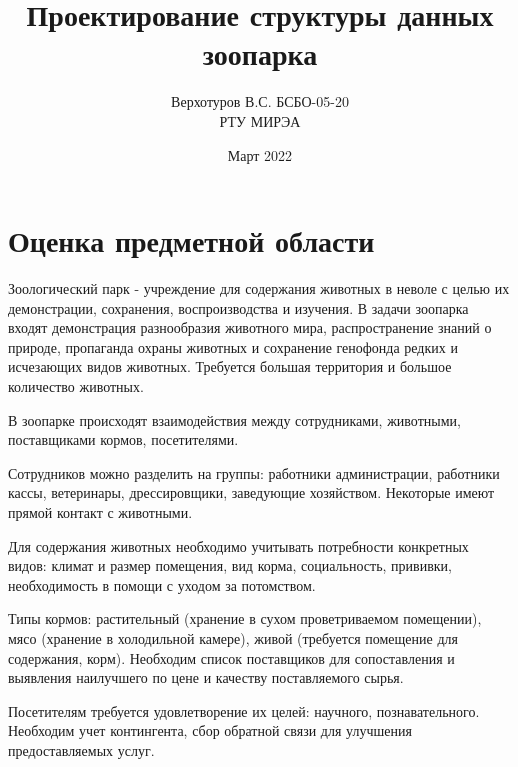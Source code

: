 \documentclass[12pt,a4paper]{article}
\title{Проектирование структуры данных зоопарка}
\author{Верхотуров В.С. БСБО-05-20\\РТУ МИРЭА}
\date{Март 2022}
\begin{document}
\maketitle

\section{Оценка предметной области}

Зоологический парк - учреждение для содержания животных в неволе с целью их демонстрации, сохранения, воспроизводства и изучения. В задачи зоопарка входят демонстрация разнообразия животного мира, распространение знаний о природе, пропаганда охраны животных и сохранение генофонда редких и исчезающих видов животных. Требуется большая территория и большое количество животных.

В зоопарке происходят взаимодействия между сотрудниками, животными, поставщиками кормов, посетителями.

Сотрудников можно разделить на группы: работники администрации, работники кассы, ветеринары, дрессировщики, заведующие хозяйством. Некоторые имеют прямой контакт с животными.

Для содержания животных необходимо учитывать потребности конкретных видов: климат и размер помещения, вид корма, социальность, прививки, необходимость в помощи с уходом за потомством.

Типы кормов: растительный (хранение в сухом проветриваемом помещении), мясо (хранение в холодильной камере), живой (требуется помещение для содержания, корм). Необходим список поставщиков для сопоставления и выявления наилучшего по цене и качеству поставляемого сырья.

Посетителям требуется удовлетворение их целей: научного, познавательного. Необходим учет контингента, сбор  обратной связи для улучшения предоставляемых услуг.
\end{document}
